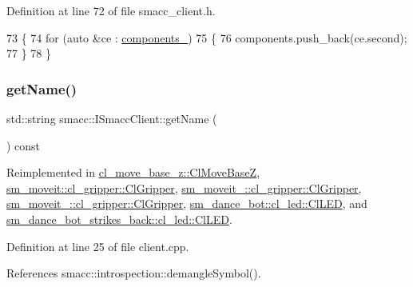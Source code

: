 Definition at line 72 of file smacc\+\_\+client.\+h.


\begin{DoxyCode}
73     \{
74         \textcolor{keywordflow}{for} (\textcolor{keyword}{auto} &ce : \hyperlink{classsmacc_1_1ISmaccClient_a9e670e9071bb549dbeb08985d0114afe}{components\_})
75         \{
76             components.push\_back(ce.second);
77         \}
78     \}
\end{DoxyCode}
\mbox{\label{classsmacc_1_1ISmaccClient_a8c3ce19f182e71909c5dc6263d25be69}} 
\subsubsection{\texorpdfstring{get\+Name()}{getName()}}
{\footnotesize\ttfamily std\+::string smacc\+::\+I\+Smacc\+Client\+::get\+Name (\begin{DoxyParamCaption}{ }\end{DoxyParamCaption}) const\hspace{0.3cm}{\ttfamily [virtual]}}



Reimplemented in \hyperlink{classcl__move__base__z_1_1ClMoveBaseZ_a3c511340ea5df8cbdb833c6c701c47f8}{cl\+\_\+move\+\_\+base\+\_\+z\+::\+Cl\+Move\+BaseZ}, \hyperlink{classsm__moveit_1_1cl__gripper_1_1ClGripper_a71ee172824d9eb24c9a386ea6d8822ea}{sm\+\_\+moveit\+::cl\+\_\+gripper\+::\+Cl\+Gripper}, \hyperlink{classsm__moveit__2_1_1cl__gripper_1_1ClGripper_a080203a4c344166dfebd84c02422a707}{sm\+\_\+moveit\+\_\+::cl\+\_\+gripper\+::\+Cl\+Gripper}, \hyperlink{classsm__moveit__3_1_1cl__gripper_1_1ClGripper_aa3ed6530f95ef8ce74f817f30e70b1b9}{sm\+\_\+moveit\+\_\+::cl\+\_\+gripper\+::\+Cl\+Gripper}, \hyperlink{classsm__dance__bot_1_1cl__led_1_1ClLED_aa0a9fb92df96fb1bbba35c78fbe4119d}{sm\+\_\+dance\+\_\+bot\+::cl\+\_\+led\+::\+Cl\+L\+ED}, and \hyperlink{classsm__dance__bot__strikes__back_1_1cl__led_1_1ClLED_aa774d43fe5a936b4bf292cb5447becd9}{sm\+\_\+dance\+\_\+bot\+\_\+strikes\+\_\+back\+::cl\+\_\+led\+::\+Cl\+L\+ED}.



Definition at line 25 of file client.\+cpp.



References smacc\+::introspection\+::demangle\+Symbol().



